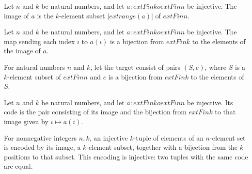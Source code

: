 \begin{definition}
\label{FABL.InjectiveLabelTuple.image}
\leanok
{}
Let $n$ and $k$ be natural numbers, and let $a:	ext{Fin }k	o	ext{Fin }n$ be injective.
The image of $a$ is the $k$-element subset $\bigl|	ext{range}(a)\bigr|$ of $	ext{Fin }n$.
\end{definition}

\begin{definition}
\label{FABL.InjectiveLabelTuple.imageEquiv}
\leanok
{}
Let $n$ and $k$ be natural numbers, and let $a:	ext{Fin }k	o	ext{Fin }n$ be injective.
The map sending each index $i$ to $a(i)$ is a bijection from $	ext{Fin }k$ to the
elements of the image of $a$.
\end{definition}

\begin{definition}
\label{FABL.InjectiveLabelCodeTarget}
\leanok
{}
For natural numbers $n$ and $k$, let the target consist of pairs $(S,e)$, where $S$ is a
$k$-element subset of $	ext{Fin }n$ and $e$ is a bijection from $	ext{Fin }k$ to the
elements of $S$.
\end{definition}

\begin{definition}
\label{FABL.InjectiveLabelTuple.code}
\leanok
{}
Let $n$ and $k$ be natural numbers, and let $a:	ext{Fin }k	o	ext{Fin }n$ be injective.
Its code is the pair consisting of its image and the bijection from $	ext{Fin }k$ to
that image given by $i\mapsto a(i)$.
\end{definition}

\begin{theorem}
\label{FABL.injectiveLabelTuple_code_injective}
\leanok
{}
For nonnegative integers $n,k$, an injective $k$-tuple of elements of an $n$-element set
is encoded by its image, a $k$-element subset, together with a bijection from the $k$
positions to that subset. This encoding is injective: two tuples with the same code are
equal.
\end{theorem}

